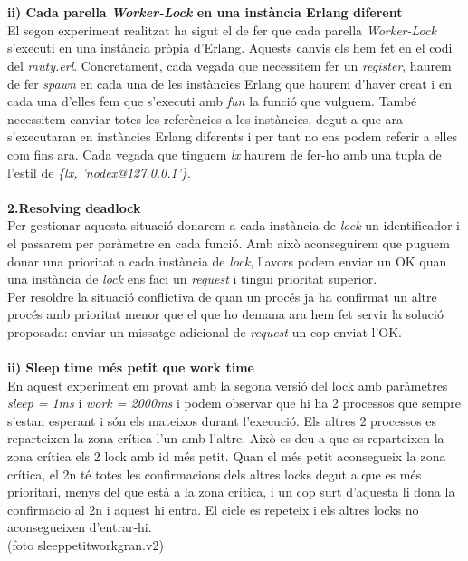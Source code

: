 \documentclass[a4paper, 10pt]{article}
\begin{document}
\begin{itemize}
\\
\\
\textbf{ii) Cada parella \textit{Worker-Lock} en una instància Erlang diferent}\\
El segon experiment realitzat ha sigut el de fer que cada parella \textit{Worker-Lock} s'executi en una instància pròpia d'Erlang. Aquests canvis els hem fet en el codi del \textit{muty.erl}. Concretament, cada vegada que necessitem fer un \textit{register}, haurem de fer \textit{spawn} en cada una de les instàncies Erlang que haurem d'haver creat i en cada una d'elles fem que s'executi amb \textit{fun} la funció que vulguem. També necessitem canviar totes les referències a les instàncies, degut a que ara s'executaran en instàncies Erlang diferents i per tant no ens podem referir a elles com fins ara. Cada vegada que tinguem \textit{lx} haurem de fer-ho amb una tupla de l'estil de \textit{\{lx, 'nodex@127.0.0.1'\}}. 
\\
\\
\textbf{2.Resolving deadlock}\\
Per gestionar aquesta situació donarem a cada instància de \textit{lock} un identificador i el passarem per paràmetre en cada funció. Amb això aconseguirem que puguem donar una prioritat a cada instància de \textit{lock}, llavors podem enviar un OK quan una instància de \textit{lock} ens faci un \textit{request} i tingui prioritat superior.\\
Per resoldre la situació conflictiva de quan un procés ja ha confirmat un altre procés amb prioritat menor que el que ho demana ara hem fet servir la solució proposada: enviar un missatge adicional de \textit{request} un cop enviat l'OK.\\
\\
\textbf{ii) Sleep time més petit que work time}\\
En aquest experiment em provat amb la segona versió del lock amb paràmetres \textit{sleep = 1ms} i \textit{work = 2000ms} i podem observar que hi ha 2 processos que sempre s'estan esperant i són els mateixos durant l'execució. Els altres 2 processos es reparteixen la zona crítica l'un amb l'altre. Això es deu a que es reparteixen la zona crítica els 2 lock amb id més petit. Quan el més petit aconsegueix la zona crítica, el 2n té totes les confirmacions dels altres locks degut a que es més prioritari, menys del que està a la zona crítica, i un cop surt d'aquesta li dona la confirmacio al 2n i aquest hi entra. El cicle es repeteix i els altres locks no aconsegueixen d'entrar-hi.\\ (foto sleeppetitworkgran.v2)

\end{itemize}
\end{document}
